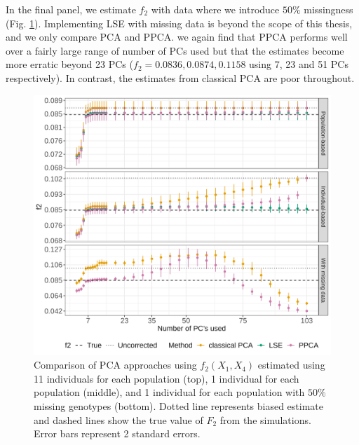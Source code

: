 \documentclass[12pt]{article}
\begin{document}
In the final panel, we estimate $f_2$ with data where we introduce $50\%$ missingness (Fig. \ref{fig:comparison}). Implementing LSE with missing data is beyond the scope of this thesis, and we only compare PCA and PPCA. we again find that PPCA performs well over a fairly large range of number of PCs used but that the estimates become more erratic beyond 23 PCs ($f_2 = 0.0836, 0.0874, 0.1158$ using 7, 23 and 51 PCs respectively). In contrast, the estimates from classical PCA are poor throughout.

\begin{figure}[ht!]
    \includegraphics[width=16.5cm]{Images/ppca/Figures/mu0.05_main_fig_all_pca.png}
    \centering
    \caption{Comparison of PCA approaches using $f_2(X_1,X_4)$ estimated using 11 individuals for each population (top), 1 individual for each population (middle), and 1 individual for each population with $50\%$ missing genotypes (bottom). Dotted line represents biased estimate and dashed lines show the true value of $F_2$ from the simulations. Error bars represent 2 standard errors.}
    \label{fig:comparison}
\end{figure}
\end{document}
